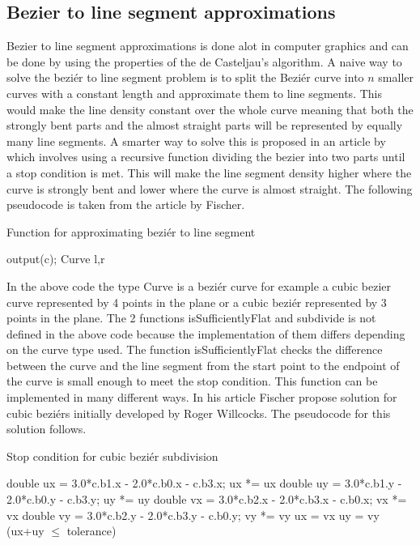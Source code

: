 \subsection{Bezier to line segment approximations}
Bezier to line segment approximations is done alot in computer graphics and can be done by using the properties of the de Casteljau's algorithm. A naive way to solve the beziér to line segment problem is to split the Beziér curve into $n$ smaller curves with a constant length and approximate them to line segments. This would make the line density constant over the whole curve meaning that both the strongly bent parts and the almost straight parts will be represented by equally many line segments. A smarter way to solve this is proposed in an article by \citet{fischer2000} which involves using a recursive function dividing the bezier into two parts until a stop condition is met. This will make the line segment density higher where the curve is strongly bent and lower where the curve is almost straight. The following pseudocode is taken from the article by Fischer.
\begin{algorithm}[H]
\caption{Function for approximating beziér to line segment}
\begin{algorithmic}
  \State output(c);
\Else
	\State Curve l,r\;
	\State{}\;
	\State{}\;
	\State{}\;
\EndIf
\EndProcedure
\end{algorithmic}
\end{algorithm}
In the above code the type Curve is a beziér curve for example a cubic bezier curve represented by 4 points in the plane or a cubic beziér represented by 3 points in the plane. The 2 functions isSufficientlyFlat and subdivide is not defined in the above code because the implementation of them differs depending on the curve type used. The function isSufficientlyFlat checks the difference between the curve and the line segment from the start point to the endpoint of the curve is small enough to meet the stop condition. This function can be implemented in many different ways. In his article Fischer propose solution for cubic beziérs initially developed by Roger Willcocks. The pseudocode for this solution follows.

\begin{algorithm}[H]
\caption{Stop condition for cubic beziér subdivision}
\begin{algorithmic}
	\State double ux = 3.0*c.b1.x - 2.0*c.b0.x - c.b3.x; ux *= ux\;
	\State double uy = 3.0*c.b1.y - 2.0*c.b0.y - c.b3.y; uy *= uy\;
	\State double vx = 3.0*c.b2.x - 2.0*c.b3.x - c.b0.x; vx *= vx\;
	\State double vy = 3.0*c.b2.y - 2.0*c.b3.y - c.b0.y; vy *= vy\;
	\State ux = vx\; 	
	\EndIf
		\State uy = vy\; 
	\EndIf
	\State\Return (ux+uy $\leq$ tolerance)\;
\EndFunction
\end{algorithmic}
\end{algorithm}

